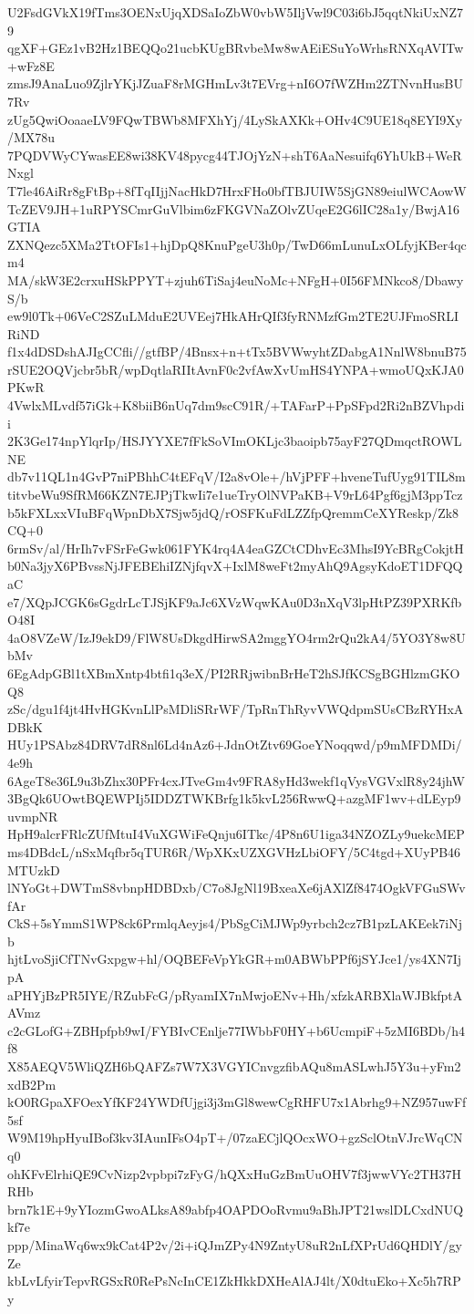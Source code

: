 U2FsdGVkX19fTms3OENxUjqXDSaIoZbW0vbW5IljVwl9C03i6bJ5qqtNkiUxNZ79
qgXF+GEz1vB2Hz1BEQQo21ucbKUgBRvbeMw8wAEiESuYoWrhsRNXqAVITw+wFz8E
zmsJ9AnaLuo9ZjlrYKjJZuaF8rMGHmLv3t7EVrg+nI6O7fWZHm2ZTNvnHusBU7Rv
zUg5QwiOoaaeLV9FQwTBWb8MFXhYj/4LySkAXKk+OHv4C9UE18q8EYI9Xy/MX78u
7PQDVWyCYwasEE8wi38KV48pycg44TJOjYzN+shT6AaNesuifq6YhUkB+WeRNxgl
T7le46AiRr8gFtBp+8fTqIIjjNacHkD7HrxFHo0bfTBJUIW5SjGN89eiulWCAowW
TcZEV9JH+1uRPYSCmrGuVlbim6zFKGVNaZOlvZUqeE2G6lIC28a1y/BwjA16GTIA
ZXNQezc5XMa2TtOFIs1+hjDpQ8KnuPgeU3h0p/TwD66mLunuLxOLfyjKBer4qcm4
MA/skW3E2crxuHSkPPYT+zjuh6TiSaj4euNoMc+NFgH+0I56FMNkco8/DbawyS/b
ew9l0Tk+06VeC2SZuLMduE2UVEej7HkAHrQIf3fyRNMzfGm2TE2UJFmoSRLIRiND
f1x4dDSDshAJIgCCfli//gtfBP/4Bnsx+n+tTx5BVWwyhtZDabgA1NnlW8bnuB75
rSUE2OQVjcbr5bR/wpDqtlaRIItAvnF0c2vfAwXvUmHS4YNPA+wmoUQxKJA0PKwR
4VwlxMLvdf57iGk+K8biiB6nUq7dm9scC91R/+TAFarP+PpSFpd2Ri2nBZVhpdii
2K3Ge174npYlqrIp/HSJYYXE7fFkSoVImOKLjc3baoipb75ayF27QDmqctROWLNE
db7v11QL1n4GvP7niPBhhC4tEFqV/I2a8vOle+/hVjPFF+hveneTufUyg91TIL8m
titvbeWu9SfRM66KZN7EJPjTkwIi7e1ueTryOlNVPaKB+V9rL64Pgf6gjM3ppTcz
b5kFXLxxVIuBFqWpnDbX7Sjw5jdQ/rOSFKuFdLZZfpQremmCeXYReskp/Zk8CQ+0
6rmSv/al/HrIh7vFSrFeGwk061FYK4rq4A4eaGZCtCDhvEc3MhsI9YcBRgCokjtH
b0Na3jyX6PBvssNjJFEBEhiIZNjfqvX+IxlM8weFt2myAhQ9AgsyKdoET1DFQQaC
e7/XQpJCGK6sGgdrLcTJSjKF9aJc6XVzWqwKAu0D3nXqV3lpHtPZ39PXRKfbO48I
4aO8VZeW/IzJ9ekD9/FlW8UsDkgdHirwSA2mggYO4rm2rQu2kA4/5YO3Y8w8UbMv
6EgAdpGBl1tXBmXntp4btfi1q3eX/PI2RRjwibnBrHeT2hSJfKCSgBGHlzmGKOQ8
zSc/dgu1f4jt4HvHGKvnLlPsMDliSRrWF/TpRnThRyvVWQdpmSUsCBzRYHxADBkK
HUy1PSAbz84DRV7dR8nl6Ld4nAz6+JdnOtZtv69GoeYNoqqwd/p9mMFDMDi/4e9h
6AgeT8e36L9u3bZhx30PFr4cxJTveGm4v9FRA8yHd3wekf1qVysVGVxlR8y24jhW
3BgQk6UOwtBQEWPIj5IDDZTWKBrfg1k5kvL256RwwQ+azgMF1wv+dLEyp9uvmpNR
HpH9alcrFRlcZUfMtuI4VuXGWiFeQnju6ITkc/4P8n6U1iga34NZOZLy9uekcMEP
ms4DBdcL/nSxMqfbr5qTUR6R/WpXKxUZXGVHzLbiOFY/5C4tgd+XUyPB46MTUzkD
lNYoGt+DWTmS8vbnpHDBDxb/C7o8JgNl19BxeaXe6jAXlZf8474OgkVFGuSWvfAr
CkS+5sYmmS1WP8ck6PrmlqAeyjs4/PbSgCiMJWp9yrbch2cz7B1pzLAKEek7iNjb
hjtLvoSjiCfTNvGxpgw+hl/OQBEFeVpYkGR+m0ABWbPPf6jSYJce1/ys4XN7IjpA
aPHYjBzPR5IYE/RZubFcG/pRyamIX7nMwjoENv+Hh/xfzkARBXlaWJBkfptAAVmz
c2cGLofG+ZBHpfpb9wI/FYBIvCEnlje77IWbbF0HY+b6UcmpiF+5zMI6BDb/h4f8
X85AEQV5WliQZH6bQAFZs7W7X3VGYICnvgzfibAQu8mASLwhJ5Y3u+yFm2xdB2Pm
kO0RGpaXFOexYfKF24YWDfUjgi3j3mGl8wewCgRHFU7x1Abrhg9+NZ957uwFf5sf
W9M19hpHyuIBof3kv3IAunIFsO4pT+/07zaECjlQOcxWO+gzSclOtnVJrcWqCNq0
ohKFvElrhiQE9CvNizp2vpbpi7zFyG/hQXxHuGzBmUuOHV7f3jwwVYc2TH37HRHb
brn7k1E+9yYIozmGwoALksA89abfp4OAPDOoRvmu9aBhJPT21wslDLCxdNUQkf7e
ppp/MinaWq6wx9kCat4P2v/2i+iQJmZPy4N9ZntyU8uR2nLfXPrUd6QHDlY/gyZe
kbLvLfyirTepvRGSxR0RePsNcInCE1ZkHkkDXHeAlAJ4lt/X0dtuEko+Xc5h7RPy
